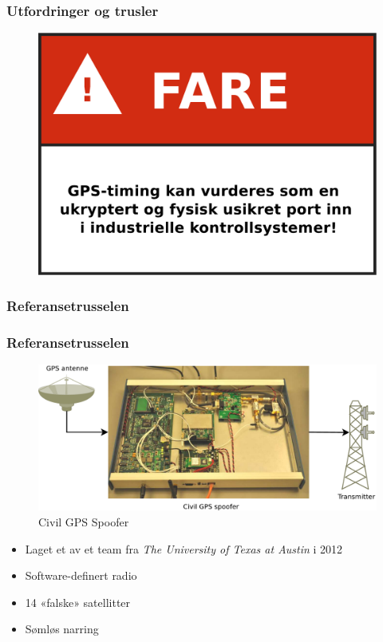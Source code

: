 \documentclass[xcolor=table]{beamer}
\begin{document}
\begin{frame}
\frametitle{Utfordringer og trusler}
      \begin{figure}
        \includegraphics[scale=0.40]{thesis/graphics/fare.pdf}
      \end{figure} 
\end{frame}

\subsubsection{Referansetrusselen}
\begin{frame}
  \frametitle{Referansetrusselen}
  \begin{figure}
    \includegraphics[scale=0.2]{thesis/graphics/spoofer_diagram.pdf}
    \caption{Civil GPS Spoofer \cite{EVPMUGA}}
  \end{figure}
  \begin{itemize}
  \item Laget et av et team fra \textit{The University of Texas at Austin} i 2012
  \item Software-definert radio
  \item 14 «falske» satellitter
  \item Sømløs narring
  \end{itemize}
\end{frame}
\end{document}

